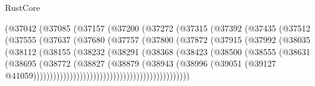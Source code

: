 \begin{lexlean}{RustCore}
\begin{coremodule}
                            (@37042
                              (@37085
                                (@37157
                                  (@37200
                                    (@37272
                                      (@37315
                                        (@37392
                                          (@37435
                                            (@37512
                                              (@37555
                                                (@37637
                                                  (@37680
                                                    (@37757
                                                      (@37800
                                                        (@37872
                                                          (@37915
                                                            (@37992
                                                              (@38035
                                                                (@38112
                                                                  (@38155
                                                                    (@38232
                                                                      (@38291
                                                                        (@38368
                                                                          (@38423
                                                                            (@38500
                                                                              (@38555
                                                                                (@38631
                                                                                  (@38695
                                                                                    (@38772
                                                                                      (@38827
                                                                                        (@38879
                                                                                          (@38943
                                                                                            (@38996
                                                                                              (@39051
                                                                                                (@39127
                                                                                                  @41059)))))))))))))))))))))))))))))))))))))))))))))))

\end{coremodule}
\end{lexlean}
